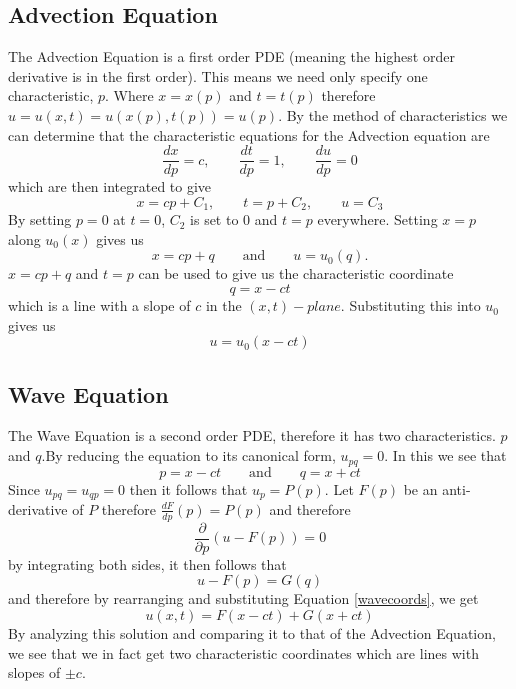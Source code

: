 \subsection{Advection Equation}
The Advection Equation is a first order PDE (meaning the highest order derivative is in the first order). This means we need only specify one characteristic, $p$. Where $x = x(p)$ and $t = t(p)$ therefore $u = u(x,t) = u(x(p),t(p)) = u(p)$.
\linebreak
\linebreak
By the method of characteristics we can determine that the characteristic equations for the Advection equation are
\begin{equation}
\frac{dx}{dp} = c, \qquad \frac{dt}{dp} = 1, \qquad \frac{du}{dp} = 0
\end{equation}
which are then integrated to give
\begin{equation}
  x = cp + C_1, \qquad t = p + C_2, \qquad u = C_3
\end{equation}
By setting $p=0$ at $t=0$, $C_2$ is set to 0 and $t=p$ everywhere. Setting $x=p$ along $u_0(x)$ gives us 
\begin{equation}
x=cp+q \qquad \text{and} \qquad u=u_0(q).
\end{equation}
\linebreak
\linebreak
$x=cp+q$ and $t=p$ can be used to give us the characteristic coordinate 
\begin{equation}
q=x-ct
\end{equation}
which is a line with a slope of $c$ in the $(x,t)-plane$. Substituting this into $u_0$ gives us
\begin{equation}
  u = u_0(x - ct)
\end{equation}
\subsection{Wave Equation}
The Wave Equation is a second order PDE, therefore it has two characteristics. $p$ and
$q$.By reducing the equation to its canonical form, $u_{pq} = 0$. In this we see that 
\begin{equation} \label{wavecoords}
p = x-ct \qquad \text{and} \qquad q = x + ct
\end{equation}
Since $u_{pq} = u_{qp} = 0$ then it follows that $u_p = P(p)$. Let $F(p)$ be an anti-derivative of $P$ therefore $\frac{dF}{dp}(p) = P(p)$ and therefore 
\begin{equation}
\frac{\partial}{\partial p}(u - F(p)) = 0
\end{equation}
by integrating both sides, it then follows that
\begin{equation}
u - F(p) = G(q)
\end{equation}
and therefore by rearranging and substituting Equation \ref{wavecoords}, we get
\begin{equation}
u(x,t) = F(x-ct) + G(x+ct)
\end{equation}
By analyzing this solution and comparing it to that of the Advection Equation, we see that we in fact get two characteristic coordinates which are lines with slopes of $\pm c$.
